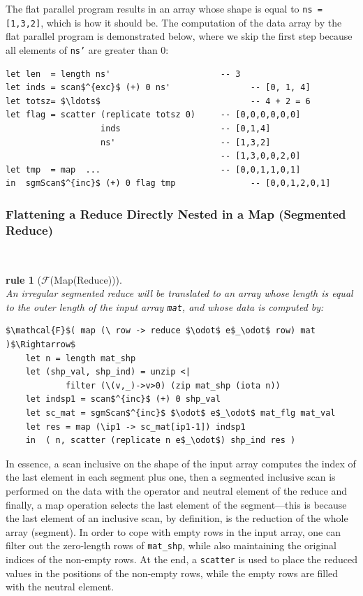 \documentclass[acmsmall,review]{acmart}\settopmatter{printfolios=true,printccs=false,printacmref=false}
\newtheorem{rewrite}{rule}
\begin{document}
The flat parallel program results in an array whose shape is 
equal to {\tt ns = [1,3,2]}, which is how it should be.
The computation of the data array by the flat parallel program is
demonstrated below, where we skip the first step because all elements
of {\tt ns'} are greater than $0$:
\begin{lstlisting}[mathescape=true]
let len  = length ns'                      -- 3
let inds = scan$^{exc}$ (+) 0 ns'                -- [0, 1, 4]
let totsz= $\ldots$                              -- 4 + 2 = 6 
let flag = scatter (replicate totsz 0)     -- [0,0,0,0,0,0]
                   inds                    -- [0,1,4]
                   ns'                     -- [1,3,2]
                                           -- [1,3,0,0,2,0]
let tmp  = map  ...                        -- [0,0,1,1,0,1]
in  sgmScan$^{inc}$ (+) 0 flag tmp               -- [0,0,1,2,0,1]
\end{lstlisting}\vspace{-2ex}

\subsubsection{Flattening a Reduce Directly Nested in a Map (Segmented Reduce)}
\label{subsubsec:red-in-map}
$\mbox{ }$\\

\begin{rewrite}[$\mathcal{F}$(Map(Reduce))]\label{Flat-Red-In-Map}
$\mbox{ }$\\
An irregular segmented reduce will be translated to an array whose
length is equal to the outer length of the input array {\tt mat}, and
whose data is computed by: 
\begin{lstlisting}[mathescape=true]
$\mathcal{F}$( map (\ row -> reduce $\odot$ e$_\odot$ row) mat )$\Rightarrow$
    let n = length mat_shp
    let (shp_val, shp_ind) = unzip <| 
            filter (\(v,_)->v>0) (zip mat_shp (iota n))
    let indsp1 = scan$^{inc}$ (+) 0 shp_val
    let sc_mat = sgmScan$^{inc}$ $\odot$ e$_\odot$ mat_flg mat_val
    let res = map (\ip1 -> sc_mat[ip1-1]) indsp1
    in  ( n, scatter (replicate n e$_\odot$) shp_ind res )
\end{lstlisting}\vspace{-2ex}
\end{rewrite}

In essence, a scan inclusive on the shape of the input array computes
the index of the last element in each segment plus one, then a segmented
inclusive scan is performed on the data with the operator and neutral
element of the reduce and finally, a map operation selects the last
element of the segment---this is because the last element of an inclusive
scan, by definition, is the reduction of the whole array (segment). 
In order to cope with empty rows in the input array, one can filter
out the zero-length rows of {\tt mat\_shp}, while also maintaining 
the original indices of the non-empty rows. At the end, a 
\lstinline{scatter} is used to place the reduced values in the
positions of the non-empty rows, while the empty rows are filled
with the neutral element.
\end{document}

